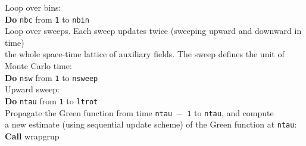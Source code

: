 \begin{mdframed}[frametitle={Basic structure of the auxiliary-field QMC implementation (\path{Prog/main.F90}):}]
{Loop over bins: \\
\textbf{Do} \texttt{nbc} from  \texttt{1} to \texttt{nbin} \\
\hspace*{1em} Loop over sweeps. Each sweep updates twice (sweeping upward and downward in time)\\
\hspace*{1em} the whole space-time lattice of auxiliary fields. The sweep defines the unit of Monte Carlo time:\\
\hspace*{1em} \textbf{Do} \texttt{nsw} from  \texttt{1} to \texttt{nsweep}  \\
\hspace*{2em} Upward sweep:\\
\hspace*{2em} \textbf{Do} \texttt{ntau} from \texttt{1} to \texttt{ltrot}\\      
\hspace*{3em} Propagate the Green function from time \texttt{ntau $-$ 1} to \texttt{ntau}, and compute\\
\hspace*{3em} a new estimate (using sequential update scheme) of the Green function at \texttt{ntau}: \\
\hspace*{3em} \textbf{Call} wrapgrup\\
         
}
\end{mdframed}
